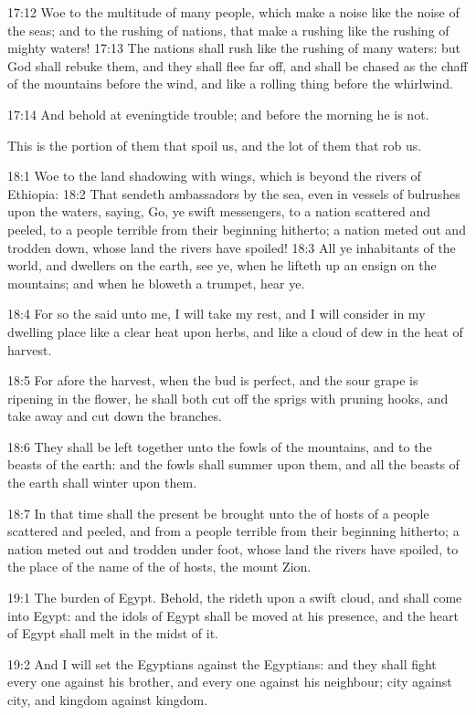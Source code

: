 17:12 Woe to the multitude of many people, which make a noise like the noise of the seas; and to the rushing of nations, that make a rushing like the rushing of mighty waters!  17:13 The nations shall rush like the rushing of many waters: but God shall rebuke them, and they shall flee far off, and shall be chased as the chaff of the mountains before the wind, and like a rolling thing before the whirlwind.

17:14 And behold at eveningtide trouble; and before the morning he is not.

This is the portion of them that spoil us, and the lot of them that rob us.

18:1 Woe to the land shadowing with wings, which is beyond the rivers of Ethiopia: 18:2 That sendeth ambassadors by the sea, even in vessels of bulrushes upon the waters, saying, Go, ye swift messengers, to a nation scattered and peeled, to a people terrible from their beginning hitherto; a nation meted out and trodden down, whose land the rivers have spoiled!  18:3 All ye inhabitants of the world, and dwellers on the earth, see ye, when he lifteth up an ensign on the mountains; and when he bloweth a trumpet, hear ye.

18:4 For so the \LORD said unto me, I will take my rest, and I will consider in my dwelling place like a clear heat upon herbs, and like a cloud of dew in the heat of harvest.

18:5 For afore the harvest, when the bud is perfect, and the sour grape is ripening in the flower, he shall both cut off the sprigs with pruning hooks, and take away and cut down the branches.

18:6 They shall be left together unto the fowls of the mountains, and to the beasts of the earth: and the fowls shall summer upon them, and all the beasts of the earth shall winter upon them.

18:7 In that time shall the present be brought unto the \LORD of hosts of a people scattered and peeled, and from a people terrible from their beginning hitherto; a nation meted out and trodden under foot, whose land the rivers have spoiled, to the place of the name of the \LORD of hosts, the mount Zion.

19:1 The burden of Egypt. Behold, the \LORD rideth upon a swift cloud, and shall come into Egypt: and the idols of Egypt shall be moved at his presence, and the heart of Egypt shall melt in the midst of it.

19:2 And I will set the Egyptians against the Egyptians: and they shall fight every one against his brother, and every one against his neighbour; city against city, and kingdom against kingdom.

